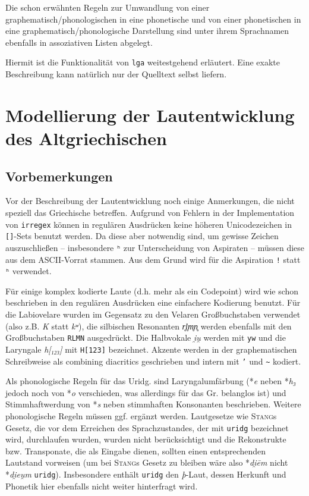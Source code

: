 \documentclass[12pt,a4paper,normalheadings,bibliography=totoc]{scrartcl}
\def\rek#1{\mbox{*\textit{#1}}}
\def\bel#1{\mbox{\textit{#1}}}
\def\tt#1{\texttt{#1}}
\begin{document}
Die schon erwähnten Regeln zur Umwandlung von einer
graphematisch/phono\-logischen in eine phonetische und von
einer phonetischen in eine graphematisch/phono\-logische Darstellung
sind unter ihrem Sprachnamen ebenfalls in
assoziativen Listen abgelegt.

Hiermit ist die Funktionalität von \tt{lga} weitestgehend erläutert.
Eine exakte Beschreibung kann natürlich nur der Quelltext selbst liefern.

\section{Modellierung der Lautentwicklung des Altgriechischen}
\subsection{Vorbemerkungen}
\label{sec:vorbemerkungen}
Vor der Beschreibung der Lautentwicklung noch einige Anmerkungen,
die nicht speziell das Griechische betreffen.
Aufgrund von Fehlern in der Implementation von \tt{irregex}
können in regulären Ausdrücken keine höheren Unicodezeichen
in \tt{[]}-Sets benutzt werden.
Da diese aber notwendig sind, um gewisse Zeichen auszuschließen
-- insbesondere \tt{ʰ} zur Unterscheidung von Aspiraten --
müssen diese aus dem ASCII-Vorrat stammen.
Aus dem Grund wird für die Aspiration \tt{!} statt \tt{ʰ} verwendet.

Für einige komplex kodierte Laute (d.h. mehr als ein Codepoint)
wird wie schon beschrieben in den regulären Ausdrücken eine einfachere
Kodierung benutzt.
Für die Labiovelare wurden im Gegensatz zu den Velaren Großbuchstaben verwendet
(also z.B. \bel{K} statt \bel{kʷ}),
die silbischen Resonanten \bel{r̥l̥m̥n̥} werden ebenfalls
mit den Großbuchstaben \tt{RLMN} ausgedrückt.
Die Halbvokale \bel{i̯u̯} werden mit \tt{yw} und
die Laryngale \bel{h[₁₂₃]} mit \tt{H[123]} bezeichnet.
Akzente werden in der graphematischen Schreibweise
als combining diacritics geschrieben und intern mit \tt{'} und \tt{\textasciitilde}
kodiert.

Als phonologische Regeln für das Uridg.
sind Laryngalumfärbung (\rek{e} neben \rek{h₃} jedoch noch von \rek{o}
verschieden, was allerdings für das Gr. belanglos ist)
und Stimmhaftwerdung von \rek{s} neben stimmhaften Konsonanten beschrieben.
Weitere phonologische Regeln müssen ggf. ergänzt werden.
Lautgesetze wie \textsc{Stang}s Gesetz,
die vor dem Erreichen des Sprachzustandes, der mit \tt{uridg} bezeichnet wird,
durchlaufen wurden,
wurden nicht berücksichtigt und die Rekonstrukte bzw. Transponate,
die als Eingabe dienen, sollten einen entsprechenden Lautstand vorweisen
(um bei \textsc{Stang}s Gesetz zu bleiben wäre also \rek{di̯ēm} nicht \rek{di̯eu̯m} \tt{uridg}).
Insbesondere enthält \tt{uridg} den \textit{þ}-Laut,
dessen Herkunft und Phonetik hier ebenfalls nicht weiter hinterfragt wird.
\end{document}
